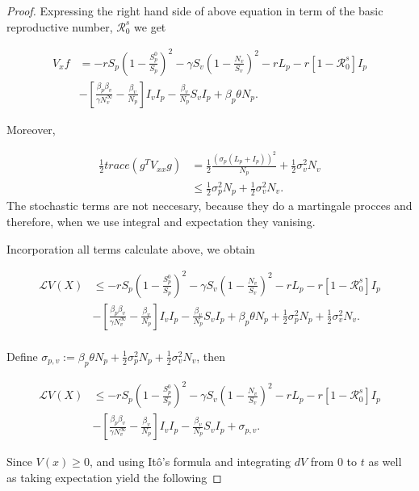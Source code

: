 \begin{proof}
	
	Expressing the right hand side of above equation in term of the basic reproductive number, $\mathcal{R}^s_0$ we get
	
	\begin{align*}
		V_x f 
			&=
				-rS_p\left(1-\frac{S_p^0}{S_p}\right)^2 -\gamma S_v\left(1-\frac{N_v}{S_v}\right)^2-rL_p-r\left[1-\mathcal{R}^s_0\right]I_p\\
			&-
				\left[\frac{\beta_p\beta_v}{\gamma N^\infty_v}-\frac{\beta_v}{N_p}\right]I_vI_p -\frac{\beta_v}{N_p}S_vI_p + \beta_p\theta N_p.
	\end{align*}
	
	Moreover,
	
	\begin{align*}
	\frac{1}{2}trace(g^TV_{xx}g) 
	&=
	\frac{1}{2} \frac{\left(\sigma_p(L_p+I_p)\right)^2}{N_p} + \frac{1}{2}\sigma_v^2 N_v\\
	&\leq
	\frac{1}{2} \sigma_p^2 N_p+ \frac{1}{2}\sigma_v^2 N_v.
	\end{align*}
	The stochastic terms are not neccesary, because they do a martingale procces and therefore, when we use integral and expectation they vanising.
	
	Incorporation all terms calculate above, we obtain
	
	
	\begin{align*}
	 	\mathcal{L}V(X) 
			&\leq
				-rS_p\left(1-\frac{S_p^0}{S_p}\right)^2 -\gamma S_v\left(1-\frac{N_v}{S_v}\right)^2-rL_p-r\left[1-\mathcal{R}^s_0\right]I_p\\
			&-
				\left[\frac{\beta_p\beta_v}{\gamma N^\infty_v}-\frac{\beta_v}{N_p}\right]I_vI_p -\frac{\beta_v}{N_p}S_vI_p + \beta_p\theta N_p+\frac{1}{2} \sigma_p^2 N_p+ \frac{1}{2}\sigma_v^2 N_v.\\
	\end{align*}
	
	Define $\sigma_{p,v}:= \beta_p\theta N_p+\frac{1}{2} \sigma_p^2 N_p+ \frac{1}{2}\sigma_v^2 N_v$, then
	
	\begin{align*}
		\mathcal{L}V(X) 
			&\leq
				-rS_p\left(1-\frac{S_p^0}{S_p}\right)^2 -\gamma S_v\left(1-\frac{N_v}{S_v}\right)^2-rL_p-r\left[1-\mathcal{R}^s_0\right]I_p\\
			&-
				\left[\frac{\beta_p\beta_v}{\gamma N^\infty_v}-\frac{\beta_v}{N_p}\right]I_vI_p -\frac{\beta_v}{N_p}S_vI_p+\sigma_{p,v}.
	\end{align*}
	
	Since $V(x)\geq 0$, and using It\^{o}'s formula and integrating $dV$ from $0$ to $t$ as well as taking expectation yield the following
	

\end{proof}
